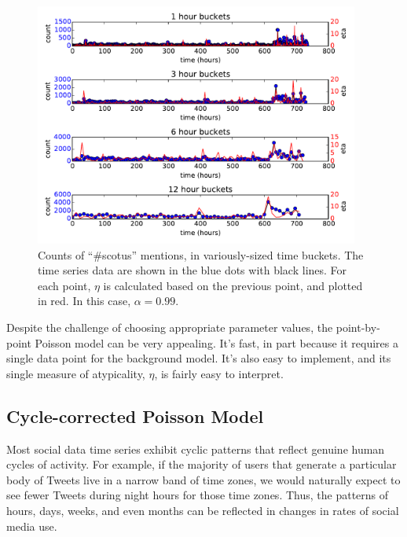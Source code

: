\documentclass{article}
\begin{document}
\begin{figure}
\begin{center}
\includegraphics[width=0.95\textwidth]{fig/scotus_bucket_size.pdf}
\caption{Counts of ``\#scotus'' mentions, in variously-sized time buckets. The time
series data are shown in the blue dots with black lines. For each point, $\eta$ is
calculated based on the previous point, and plotted in red. In this case,
$\alpha = 0.99$.}
\label{fig:scotus2}
\end{center}
\end{figure}

Despite the challenge of choosing appropriate parameter values, the
point-by-point Poisson model can be very appealing. It's fast, in part
because it requires a single data point for the background model. It's also
easy to implement, and its single measure of atypicality, $\eta$, is fairly easy
to interpret. 

\subsection{Cycle-corrected Poisson Model}
\label{ccpm}

Most social data time series exhibit cyclic patterns that reflect genuine human
cycles of activity. For example, if the majority of users that generate a
particular body of Tweets live in a narrow band of time zones, we would
naturally expect to see fewer Tweets during night hours for those time zones.
Thus, the patterns of hours, days, weeks, and even months can be reflected in
changes in rates of social media use. 
\end{document}
